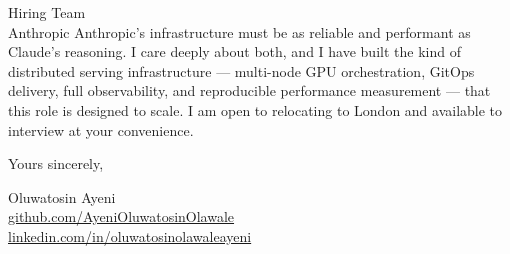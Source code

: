 \documentclass[12pt,a4paper]{letter}
\begin{document}
\begin{letter}{Hiring Team \\ Anthropic}
Anthropic's infrastructure must be as reliable and performant as Claude's reasoning. I care deeply about both, and I have built the kind of distributed serving infrastructure — multi-node GPU orchestration, GitOps delivery, full observability, and reproducible performance measurement — that this role is designed to scale. I am open to relocating to London and available to interview at your convenience.

\closing{Yours sincerely,}

Oluwatosin Ayeni \\
\href{https://github.com/AyeniOluwatosinOlawale}{github.com/AyeniOluwatosinOlawale} \\
\href{https://www.linkedin.com/in/oluwatosinolawaleayeni/}{linkedin.com/in/oluwatosinolawaleayeni}

\end{letter}
\end{document}
